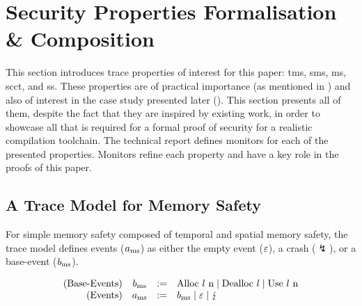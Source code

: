 \section{Security Properties Formalisation \& Composition}\label{sec:compprop}

This section introduces trace properties of interest for this paper: \gls*{tms}, \gls*{sms}, \gls*{ms}, \gls*{scct}, and \gls*{ss}.
These properties are of practical importance (as mentioned in ) and also of interest in the case study presented later (). 
This section presents all of them, despite the fact that they are inspired by existing work, in order to showcase all that is required for a formal proof of security for a realistic compilation toolchain.
The technical report defines monitors for each of the presented properties.
% 
Monitors refine each property and have a key role in the proofs of this paper.

\subsection{A Trace Model for Memory Safety}\label{subsec:basic:memsafety:tracemodel}

For simple memory safety composed of temporal and spatial memory safety, the trace model defines events ($\event[_{\mssafe}]$) as either the empty event ($\emptyevent$), a crash ($\lightning$), or a base-event ($\preevent[_{\mssafe}]$).

\vspace{-1.0em}
\[
  \begin{array}{rcll}
    \text{(Base-Events)}&\preevent[_{\mssafe}] &:=& \ev{Alloc \loc\ n} \mid \ev{Dealloc \loc} \mid \ev{Use \loc\ n} \\
    \text{(Events)}&\event[_{\mssafe}] &:=& \preevent[_{\mssafe}] \mid \emptyevent \mid \lightning \\ 
  \end{array}
\]

